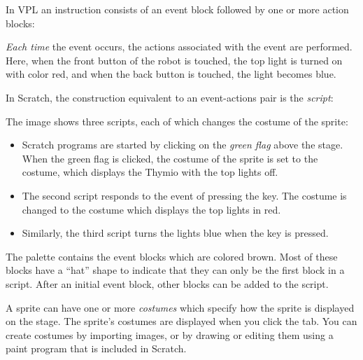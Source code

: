 \label{ch.events}



In VPL an instruction consists of an event block followed by one or
more action blocks:


\emph{Each time} the event occurs, the actions associated with the event
are performed. Here, when the front button of the robot is touched, the
top light is turned on with color red, and when the back button is
touched, the light becomes blue.

In Scratch, the construction equivalent to an event-actions pair is the
\emph{script}:


The image shows three scripts, each of which changes the costume of the
sprite:

\begin{itemize}

\item Scratch programs are started by clicking on the \emph{green flag}
above the stage. When the green flag is clicked, the costume of the
sprite is set to the  costume, which displays the Thymio with
the top lights off.

\item The second script responds to the event of pressing the 
key. The costume is changed to the  costume which displays the
top lights in red.

\item Similarly, the third script turns the lights blue when the 
key is pressed.

\end{itemize}

The  palette contains the event blocks which are colored
brown. Most of these blocks have a ``hat'' shape to indicate that they
can only be the first block in a script. After an initial event block,
other blocks can be added to the script.



A sprite can have one or more \emph{costumes} which specify how the
sprite is displayed on the stage. The sprite's costumes are displayed
when you click the  tab. You can create costumes by
importing images, or by drawing or editing them using a paint program
that is included in Scratch.


